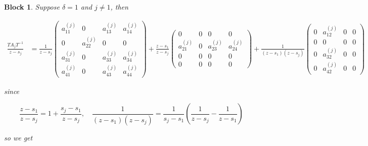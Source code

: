 \documentclass[12pt]{article}
\newtheorem{block}{Block}
\begin{document}
\begin{block}

Suppose $\delta = 1$ and $j\ne 1$, then

\[
\begin{aligned}
    \frac{T A_j T^{-1}}{z-s_j} &=
    \frac{1}{z-s_j}
    \begin{pmatrix}
        a_{11}^{(j)} & 0 & a_{13}^{(j)} & a_{14}^{(j)} \\[10pt]
        0 & a_{22}^{(j)} & 0 & 0\\[10pt]
        a_{31}^{(j)} & 0 & a_{33}^{(j)} & a_{34}^{(j)} \\[10pt]
        a_{41}^{(j)} & 0 & a_{43}^{(j)} & a_{44}^{(j)}
    \end{pmatrix}
    +\frac{z-s_1}{z-s_j}
    \begin{pmatrix}
        0 & 0 & 0 & 0 \\[10pt]
        a_{21}^{(j)} & 0 & a_{23}^{(j)}  & a_{24}^{(j)}\\[10pt]
        0 & 0 & 0 & 0 \\[10pt]
        0 & 0 & 0 & 0
    \end{pmatrix}
    +\frac{1}{(z-s_1)(z-s_j)}
    \begin{pmatrix}
        0 & a_{12}^{(j)} & 0 & 0 \\[10pt]
        0 & 0 & 0 & 0 \\[10pt]
        0 & a_{32}^{(j)} & 0 & 0 \\[10pt]
        0 & a_{42}^{(j)} & 0 & 0
    \end{pmatrix}
\end{aligned}
\]

since

\[
    \frac{z-s_1}{z-s_j} = 1 + \frac{s_j-s_1}{z-s_j}, \quad
    \frac{1}{(z-s_1)(z-s_j)} = \frac{1}{s_j-s_1}
    \left( \frac{1}{z-s_j} - \frac{1}{z-s_1} \right)
\]

so we get


\end{block}
\end{document}

